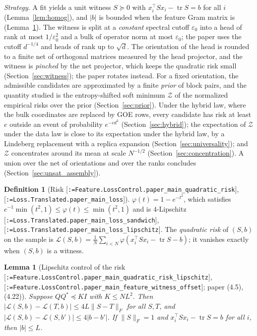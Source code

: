 \documentclass[11pt]{article}
\makeatletter
\newcommand{\formal@break}[1]{\@tfor\formal@tok:=#1\do{%
  \formal@tok
  \expandafter\ifx\formal@tok.\allowbreak\else
  \expandafter\ifx\formal@tok\_\allowbreak\fi\fi}}
\DeclareRobustCommand{\formal}[1]{\textnormal{[\texttt{\small\formal@break{#1}}]}}
\newcommand{\norm}[1]{\lVert #1\rVert}
\newcommand{\abs}[1]{\lvert #1\rvert}
\newcommand{\tr}{\operatorname{tr}}
\newcommand{\Fro}{F}
\newcommand{\Id}{I}
\theoremstyle{plain}
\newtheorem{lemma}[theorem]{Lemma}
\theoremstyle{definition}
\newtheorem{definition}[theorem]{Definition}
\makeatother
\begin{document}
\emph{Strategy.} A fit yields a unit witness $S \succeq 0$ with
$x_i^{\top}Sx_i - \tr S = b$ for all $i$ (Lemma~\ref{lem:homog}), and $\abs{b}$
is bounded when the feature Gram matrix is (Lemma~\ref{lem:offset}). The
witness is split at a \emph{constant} spectral cutoff $\varepsilon_0$ into a
head of rank at most $1/\varepsilon_0^2$ and a bulk of operator norm at most
$\varepsilon_0$; the paper uses the cutoff $d^{-1/4}$ and heads of rank up to
$\sqrt d$. The orientation of the head is rounded to a finite net of
orthogonal matrices measured by the head projector, and the witness is
\emph{pinched} by the net projector, which keeps the quadratic risk small
(Section~\ref{sec:witness}); the paper rotates instead. For a fixed
orientation, the admissible candidates are approximated by a finite
\emph{prior} of block pairs, and the quantity studied is the entropy-shifted
soft minimum $\mathcal{Z}$ of the normalized empirical risks over the prior
(Section~\ref{sec:prior}). Under the hybrid law, where the bulk coordinates
are replaced by GOE rows, every candidate has risk at least $e$ outside an
event of probability $e^{-cd^2}$ (Section~\ref{sec:hybrid}); the expectation of
$\mathcal{Z}$ under the data law is close to its expectation under the
hybrid law, by a Lindeberg replacement with a replica expansion
(Section~\ref{sec:universality}); and $\mathcal{Z}$ concentrates around its
mean at scale $N^{-1/2}$ (Section~\ref{sec:concentration}). A union over the
net of orientations and over the ranks concludes (Section~\ref{sec:unsat_assembly}).

\begin{definition}[Risk \formal{Feature.LossControl.paper\_main\_quadratic\_risk}, \formal{Loss.Translated.paper\_main\_loss}]
$\varphi(t) = 1 - e^{-t^2}$, which satisfies $e^{-1}\min(t^2, 1) \le \varphi(t) \le \min(t^2, 1)$
and is $4$-Lipschitz \formal{Loss.Translated.paper\_main\_loss\_sandwich},
\formal{Loss.Translated.paper\_main\_loss\_lipschitz}. The \emph{quadratic
risk} of $(S, b)$ on the sample is
$\mathcal{L}(S, b) = \frac1N\sum_{i<N}\varphi(x_i^{\top}Sx_i - \tr S - b)$;
it vanishes exactly when $(S, b)$ is a witness.
\end{definition}

\begin{lemma}[Lipschitz control of the risk \formal{Feature.LossControl.paper\_main\_quadratic\_risk\_lipschitz}, \formal{Feature.LossControl.paper\_main\_feature\_witness\_offset}; paper (4.5), (4.22)]\label{lem:offset}
Suppose $QQ^{*} \preceq K\Id$ with $K \le NL^2$. Then
$\abs{\mathcal{L}(S, b) - \mathcal{L}(T, b)} \le 4L\norm{S - T}_\Fro$ for all
$S, T$, and $\abs{\mathcal{L}(S,b) - \mathcal{L}(S,b')} \le 4\abs{b - b'}$. If
$\norm{S}_\Fro = 1$ and $x_i^{\top}Sx_i - \tr S = b$ for all $i$, then $\abs{b} \le L$.
\end{lemma}
\end{document}
